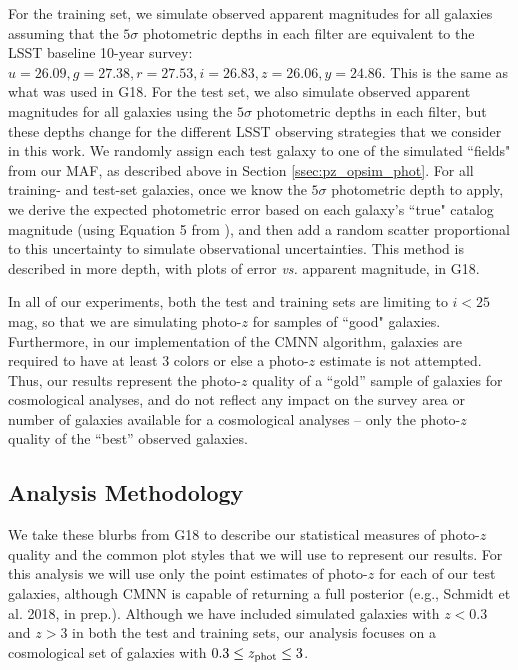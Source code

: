 For the training set, we simulate observed apparent magnitudes for all galaxies assuming that the $5{\sigma}$ photometric depths in each filter are equivalent to the LSST baseline 10-year survey: $u=26.09,g=27.38,r=27.53,i=26.83,z=26.06,y=24.86$. This is the same as what was used in G18. For the test set, we also simulate observed apparent magnitudes for all galaxies using the $5{\sigma}$ photometric depths in each filter, but these depths change for the different LSST observing strategies that we consider in this work. We randomly assign each test galaxy to one of the simulated ``fields" from our MAF, as described above in Section \ref{ssec:pz_opsim_phot}. For all training- and test-set galaxies, once we know the $5{\sigma}$ photometric depth to apply, we derive the expected photometric error based on each galaxy's ``true" catalog magnitude (using Equation 5 from \cite{2008arXiv0805.2366I}), and then add a random scatter proportional to this uncertainty to simulate observational uncertainties. This method is described in more depth, with plots of error {\it vs.} apparent magnitude, in G18.

In all of our experiments, both the test and training sets are limiting to $i<25$ mag, so that we are simulating photo-$z$ for samples of ``good" galaxies. Furthermore, in our implementation of the CMNN algorithm, galaxies are required to have at least 3 colors or else a photo-$z$ estimate is not attempted. Thus, our results represent the photo-$z$ quality of a ``gold'' sample of galaxies for cosmological analyses, and do not reflect any impact on the survey area or number of galaxies available for a cosmological analyses -- only the photo-$z$ quality of the ``best'' observed galaxies.


\subsection{Analysis Methodology}\label{ssec:pz_exp_meth}

We take these blurbs from G18 to describe our statistical measures of photo-$z$ quality and the common plot styles that we will use to represent our results. For this analysis we will use only the point estimates of photo-$z$ for each of our test galaxies, although CMNN is capable of returning a full posterior (e.g., Schmidt et al. 2018, in prep.). Although we have included simulated galaxies with $z<0.3$ and $z>3$ in both the test and training sets, our analysis focuses on a cosmological set of galaxies with $0.3 \leq z_{\rm phot} \leq 3$.

